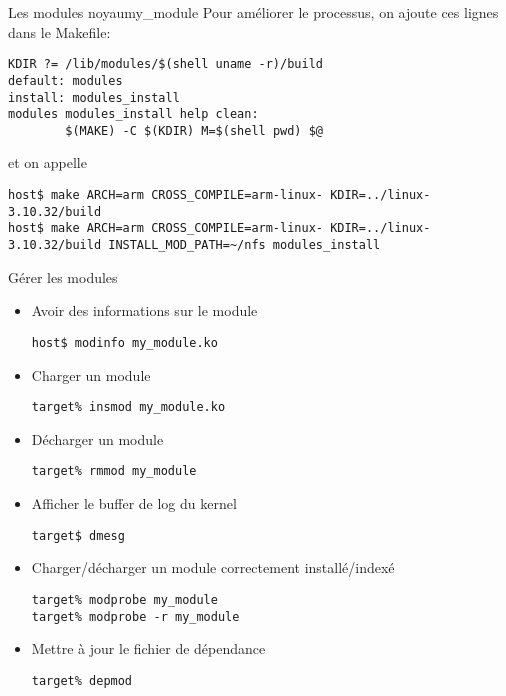 \begin{frame}[fragile=singleslide]{Les modules noyau}{my\_module}
  Pour améliorer le processus, on ajoute ces lignes dans le Makefile:
  \begin{lstlisting}
KDIR ?= /lib/modules/$(shell uname -r)/build
default: modules
install: modules_install
modules modules_install help clean:
        $(MAKE) -C $(KDIR) M=$(shell pwd) $@
  \end{lstlisting}
  et on appelle
  \begin{lstlisting}
host$ make ARCH=arm CROSS_COMPILE=arm-linux- KDIR=../linux-3.10.32/build
host$ make ARCH=arm CROSS_COMPILE=arm-linux- KDIR=../linux-3.10.32/build INSTALL_MOD_PATH=~/nfs modules_install
  \end{lstlisting} %
\end{frame}

\begin{frame}[fragile=singleslide]{Gérer les modules}
  \begin{itemize}
  \item Avoir des informations sur le module
    \begin{lstlisting}
host$ modinfo my_module.ko
    \end{lstlisting} %
  \item Charger un module
    \begin{lstlisting}
target% insmod my_module.ko
    \end{lstlisting} %
  \item Décharger un module
    \begin{lstlisting}
target% rmmod my_module
    \end{lstlisting}%
  \item Afficher le buffer de log du kernel
    \begin{lstlisting}
target$ dmesg
    \end{lstlisting} %
  \item Charger/décharger un module correctement installé/indexé
    \begin{lstlisting}
target% modprobe my_module
target% modprobe -r my_module
    \end{lstlisting} %
  \item Mettre à jour le fichier de dépendance
    \begin{lstlisting}
target% depmod
    \end{lstlisting} %
  \end{itemize}
\end{frame}

